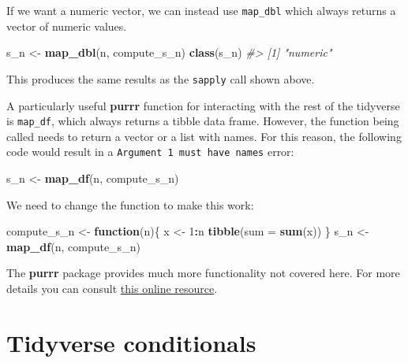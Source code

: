 \documentclass[
]{krantz}
\newenvironment{Shaded}{\begin{snugshade}}{\end{snugshade}}
\newcommand{\CommentTok}[1]{\textcolor[rgb]{0.37,0.37,0.37}{\textit{#1}}}
\newcommand{\ControlFlowTok}[1]{\textcolor[rgb]{0.27,0.27,0.27}{\textbf{#1}}}
\newcommand{\DataTypeTok}[1]{\textcolor[rgb]{0.27,0.27,0.27}{#1}}
\newcommand{\DecValTok}[1]{\textcolor[rgb]{0.06,0.06,0.06}{#1}}
\newcommand{\KeywordTok}[1]{\textcolor[rgb]{0.27,0.27,0.27}{\textbf{#1}}}
\newcommand{\NormalTok}[1]{#1}
\newcommand{\OperatorTok}[1]{\textcolor[rgb]{0.43,0.43,0.43}{\textbf{#1}}}
\newcommand{\StringTok}[1]{\textcolor[rgb]{0.5,0.5,0.5}{#1}}
\begin{document}
If we want a numeric vector, we can instead use \texttt{map\_dbl} which always returns a vector of numeric values.

\begin{Shaded}
\begin{Highlighting}[]
\NormalTok{s_n <-}\StringTok{ }\KeywordTok{map_dbl}\NormalTok{(n, compute_s_n)}
\KeywordTok{class}\NormalTok{(s_n)}
\CommentTok{#> [1] "numeric"}
\end{Highlighting}
\end{Shaded}

This produces the same results as the \texttt{sapply} call shown above.

A particularly useful \textbf{purrr} function for interacting with the rest of the tidyverse is \texttt{map\_df}, which always returns a tibble data frame. However, the function being called needs to return a vector or a list with names. For this reason, the following code would result in a \texttt{Argument\ 1\ must\ have\ names} error:

\begin{Shaded}
\begin{Highlighting}[]
\NormalTok{s_n <-}\StringTok{ }\KeywordTok{map_df}\NormalTok{(n, compute_s_n)}
\end{Highlighting}
\end{Shaded}

We need to change the function to make this work:

\begin{Shaded}
\begin{Highlighting}[]
\NormalTok{compute_s_n <-}\StringTok{ }\ControlFlowTok{function}\NormalTok{(n)\{}
\NormalTok{  x <-}\StringTok{ }\DecValTok{1}\OperatorTok{:}\NormalTok{n}
  \KeywordTok{tibble}\NormalTok{(}\DataTypeTok{sum =} \KeywordTok{sum}\NormalTok{(x))}
\NormalTok{\}}
\NormalTok{s_n <-}\StringTok{ }\KeywordTok{map_df}\NormalTok{(n, compute_s_n)}
\end{Highlighting}
\end{Shaded}

The \textbf{purrr} package provides much more functionality not covered here. For more details you can consult \href{https://jennybc.github.io/purrr-tutorial/}{this online resource}.

\hypertarget{tidyverse-conditionals}{%
\section{Tidyverse conditionals}\label{tidyverse-conditionals}}
\end{document}
